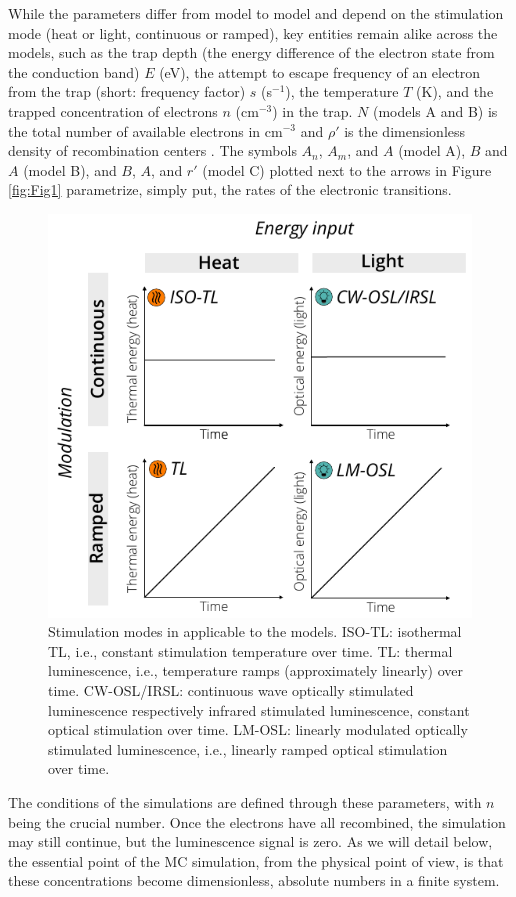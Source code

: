 While the parameters differ from model to model and depend on the
stimulation mode (heat or light, continuous or ramped), key entities
remain alike across the models, such as the trap depth (the energy
difference of the electron state from the conduction band) \(E\) (eV),
the attempt to escape frequency of an electron from the trap (short:
frequency factor) \(s\) (s\(^{-1}\)), the temperature \(T\) (K), and the
trapped concentration of electrons \(n\) (cm\(^{-3}\)) in the trap.
\(N\) (models A and B) is the total number of available electrons in
cm\(^{-3}\) and \(\rho'\) is the dimensionless density of recombination
centers \citep[model C,][]{Huntley:2006gs}. The symbols \(A_n\), \(A_m\),
and \(A\) (model A), \(B\) and \(A\) (model B), and \(B\), \(A\), and
\(r'\) (model C) plotted next to the arrows in Figure\(~\)
\ref{fig:Fig1} parametrize, simply put, the rates of the electronic
transitions.

\begin{figure}[h]
\begin{center}
\includegraphics[width=.5\textwidth]{figures/Fig2-1.pdf}
\caption{Stimulation modes in  applicable to the models. ISO-TL: isothermal TL, i.e., constant stimulation temperature over time. TL: thermal luminescence, i.e., temperature ramps (approximately linearly) over time. CW-OSL/IRSL: continuous wave optically stimulated luminescence respectively infrared stimulated luminescence, constant optical stimulation over time. LM-OSL: linearly modulated optically stimulated luminescence, i.e., linearly ramped optical stimulation over time.}
\label{fig:Fig2}
\end{center}
\end{figure}

The conditions of the simulations are defined through these parameters,
with \(n\) being the crucial number. Once the electrons have all
recombined, the simulation may still continue, but the luminescence
signal is zero. As we will detail below, the essential point of the MC
simulation, from the physical point of view, is that these
concentrations become dimensionless, absolute numbers in a finite
system.

